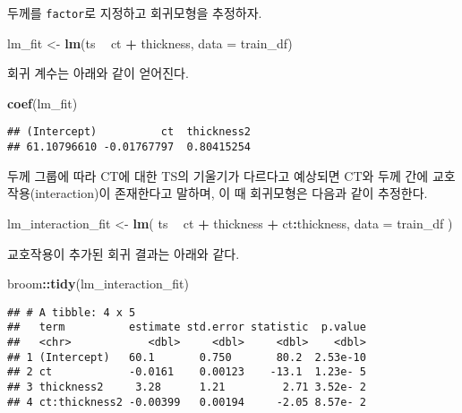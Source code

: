 \documentclass[]{book}
\newenvironment{Shaded}{\begin{snugshade}}{\end{snugshade}}
\newcommand{\DataTypeTok}[1]{\textcolor[rgb]{0.13,0.29,0.53}{#1}}
\newcommand{\KeywordTok}[1]{\textcolor[rgb]{0.13,0.29,0.53}{\textbf{#1}}}
\newcommand{\NormalTok}[1]{#1}
\newcommand{\OperatorTok}[1]{\textcolor[rgb]{0.81,0.36,0.00}{\textbf{#1}}}
\newcommand{\StringTok}[1]{\textcolor[rgb]{0.31,0.60,0.02}{#1}}
\begin{document}
두께를 \texttt{factor}로 지정하고 회귀모형을 추정하자.

\begin{Shaded}
\begin{Highlighting}[]
\NormalTok{lm_fit <-}\StringTok{ }\KeywordTok{lm}\NormalTok{(ts }\OperatorTok{~}\StringTok{ }\NormalTok{ct }\OperatorTok{+}\StringTok{ }\NormalTok{thickness, }\DataTypeTok{data =}\NormalTok{ train_df)}
\end{Highlighting}
\end{Shaded}

회귀 계수는 아래와 같이 얻어진다.

\begin{Shaded}
\begin{Highlighting}[]
\KeywordTok{coef}\NormalTok{(lm_fit)}
\end{Highlighting}
\end{Shaded}

\begin{verbatim}
## (Intercept)          ct  thickness2 
## 61.10796610 -0.01767797  0.80415254
\end{verbatim}

두께 그룹에 따라 CT에 대한 TS의 기울기가 다르다고 예상되면 CT와 두께 간에 교호작용(interaction)이 존재한다고 말하며, 이 때 회귀모형은 다음과 같이 추정한다.

\begin{Shaded}
\begin{Highlighting}[]
\NormalTok{lm_interaction_fit <-}\StringTok{ }\KeywordTok{lm}\NormalTok{(}
\NormalTok{  ts }\OperatorTok{~}\StringTok{ }\NormalTok{ct }\OperatorTok{+}\StringTok{ }\NormalTok{thickness }\OperatorTok{+}\StringTok{ }\NormalTok{ct}\OperatorTok{:}\NormalTok{thickness, }
  \DataTypeTok{data =}\NormalTok{ train_df}
\NormalTok{)}
\end{Highlighting}
\end{Shaded}

교호작용이 추가된 회귀 결과는 아래와 같다.

\begin{Shaded}
\begin{Highlighting}[]
\NormalTok{broom}\OperatorTok{::}\KeywordTok{tidy}\NormalTok{(lm_interaction_fit)}
\end{Highlighting}
\end{Shaded}

\begin{verbatim}
## # A tibble: 4 x 5
##   term          estimate std.error statistic  p.value
##   <chr>            <dbl>     <dbl>     <dbl>    <dbl>
## 1 (Intercept)   60.1       0.750       80.2  2.53e-10
## 2 ct            -0.0161    0.00123    -13.1  1.23e- 5
## 3 thickness2     3.28      1.21         2.71 3.52e- 2
## 4 ct:thickness2 -0.00399   0.00194     -2.05 8.57e- 2
\end{verbatim}
\end{document}
